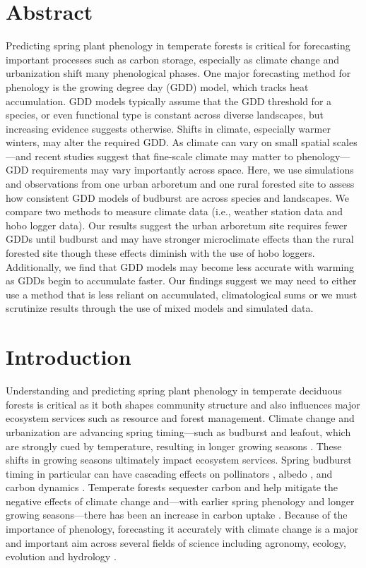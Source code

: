 \documentclass{article}\usepackage[]{graphicx}\usepackage[]{color}
\begin{document}
\section*{Abstract} 
Predicting spring plant phenology in temperate forests is critical for forecasting important processes such as carbon storage, especially as climate change and urbanization shift many phenological phases. One major forecasting method for phenology is the growing degree day (GDD) model, which tracks heat accumulation. GDD models typically assume that the GDD threshold for a species, or even functional type is constant across diverse landscapes, but increasing evidence suggests otherwise. Shifts in climate, especially warmer winters, may alter the required GDD. As climate can vary on small spatial scales---and recent studies suggest that fine-scale climate may matter to phenology---GDD requirements may vary importantly across space. Here, we use simulations and observations from one urban arboretum and one rural forested site to assess how consistent GDD models of budburst are across species and landscapes. We compare two methods to measure climate data (i.e., weather station data and hobo logger data). Our results suggest the urban arboretum site requires fewer GDDs until budburst and may have stronger microclimate effects than the rural forested site though these effects diminish with the use of hobo loggers. Additionally, we find that GDD models may become less accurate with warming as GDDs begin to accumulate faster. Our findings suggest we may need to either use a method that is less reliant on accumulated, climatological sums or we must scrutinize results through the use of mixed models and simulated data.

\section*{Introduction}

Understanding and predicting spring plant phenology in temperate deciduous forests is critical as it both shapes community structure and also influences major ecosystem services such as resource and forest management. Climate change and urbanization are advancing spring timing---such as budburst and leafout, which are strongly cued by temperature, resulting in longer growing seasons \citep{Chuine2001}. These shifts in growing seasons ultimately impact ecosystem services. Spring budburst timing in particular can have cascading effects on pollinators \citep{Boggs2012, Pardee2017}, albedo \citep{Williamson2016}, and carbon dynamics \citep{Richardson2013}. Temperate forests sequester carbon and help mitigate the negative effects of climate change and---with earlier spring phenology and longer growing seasons---there has been an increase in carbon uptake \citep{Keenan2014}. Because of the importance of phenology, forecasting it accurately with climate change is a major and important aim across several fields of science including agronomy, ecology, evolution and hydrology \citep{Moorcroft2001,Bolton2013,Yu2016,Taylor2020}. 
  
\end{document}
